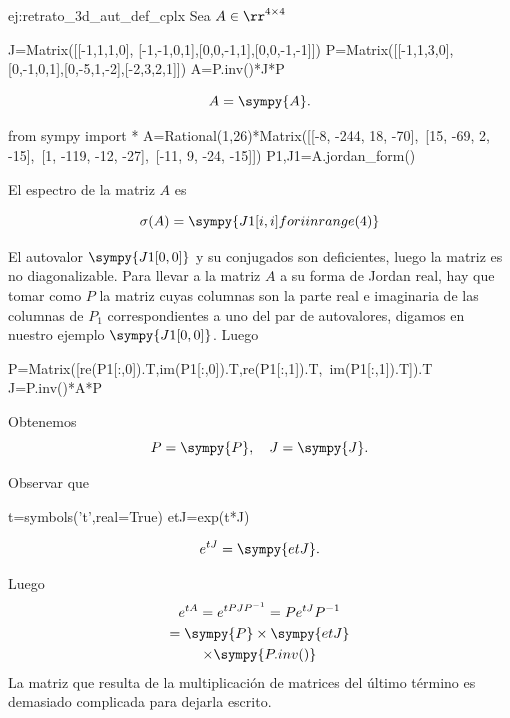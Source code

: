\begin{ejemplo}{ej:retrato_3d_aut_def_cplx} Sea $A\in\rr^{4\times 4}$ 
 
 \begin{sympycode}
J=Matrix([[-1,1,1,0], [-1,-1,0,1],[0,0,-1,1],[0,0,-1,-1]])
P=Matrix([[-1,1,3,0], [0,-1,0,1],[0,-5,1,-2],[-2,3,2,1]])
A=P.inv()*J*P
 \end{sympycode}

 \[
  A=\sympy{A}.
 \]

 \begin{sympyblock}[][numbers=left,frame=single,framesep=5mm]
from sympy import *
A=Rational(1,26)*Matrix([[-8, -244, 18, -70],\
[15, -69, 2, -15],\
[1, -119, -12, -27],\
[-11, 9, -24, -15]])
P1,J1=A.jordan_form()
\end{sympyblock}
 
 

El espectro de la matriz $A$ es 

$$\sigma(A)=\sympy{ {J1[i,i] for i in range(4)} }$$

El autovalor $\sympy{J1[0,0]}$ y su conjugados son deficientes, luego la matriz es no diagonalizable. Para llevar a la matriz $A$ a su forma de Jordan real, hay que tomar como $P$ la matriz cuyas columnas son  la parte real e imaginaria de las columnas de $P_1$ correspondientes a uno del par de autovalores, digamos en nuestro ejemplo $\sympy{J1[0,0]}$. Luego

\begin{sympyblock}[][numbers=left,frame=single,framesep=5mm]
P=Matrix([re(P1[:,0]).T,im(P1[:,0]).T,re(P1[:,1]).T,\
    im(P1[:,1]).T]).T
J=P.inv()*A*P
\end{sympyblock} 

Obtenemos
\[
 P=\sympy{P},\quad J=\sympy{J}. 
\]

 Observar que
 \begin{sympycode}
t=symbols('t',real=True)
etJ=exp(t*J)
 \end{sympycode}

 
 \[
  e^{tJ}=\sympy{etJ}.
 \]

 Luego
{\small
 \begin{multline*}
  e^{tA}=e^{tPJP^{-1}}=Pe^{tJ}P^{-1}\\
  =\sympy{P}\times\sympy{etJ}\\ \times \sympy{P.inv()}\\
 \end{multline*}
 }
La matriz que resulta de la multiplicación de matrices del último término es demasiado complicada para dejarla escrito. 

 
\end{ejemplo}














